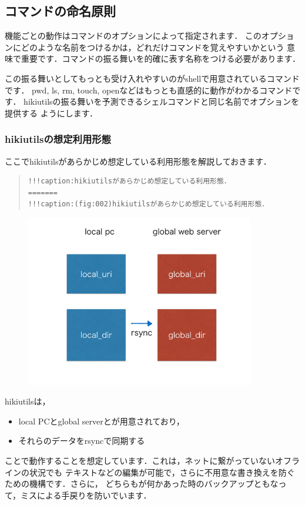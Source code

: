 
\subsection{コマンドの命名原則}
機能ごとの動作はコマンドのオプションによって指定されます．
このオプションにどのような名前をつけるかは，どれだけコマンドを覚えやすいかという
意味で重要です．コマンドの振る舞いを的確に表す名称をつける必要があります．

この振る舞いとしてもっとも受け入れやすいのがshellで用意されているコマンドです．
pwd, ls, rm, touch, openなどはもっとも直感的に動作がわかるコマンドです．
hikiutilsの振る舞いを予測できるシェルコマンドと同じ名前でオプションを提供する
ようにします．

\subsubsection{hikiutilsの想定利用形態}
ここでhikiutilsがあらかじめ想定している利用形態を解説しておきます．
\begin{quote}\begin{verbatim}
!!!caption:hikiutilsがあらかじめ想定している利用形態．
=======
!!!caption:(fig:002)hikiutilsがあらかじめ想定している利用形態．
\end{verbatim}\end{quote}
\begin{figure}[htbp]\begin{center}
\includegraphics[width=10cm,bb= 0 0 737 553]{../figs/./hikiutils_yamane.002.jpg}
\caption{}
\label{default}\end{center}\end{figure}
hikiutilsは，

\begin{itemize}
\item local PCとglobal serverとが用意されており，
\item それらのデータをrsyncで同期する
\end{itemize}
ことで動作することを想定しています．これは，ネットに繋がっていないオフラインの状況でも
テキストなどの編集が可能で，さらに不用意な書き換えを防ぐための機構です．さらに，
どちらもが何かあった時のバックアップともなって，ミスによる手戻りを防いでいます．


